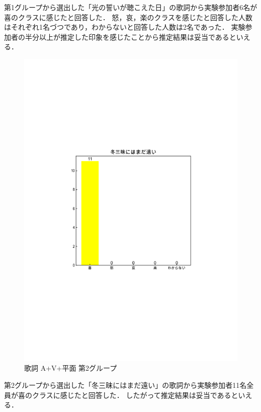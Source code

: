 第1グループから選出した「光の誓いが聴こえた日」の歌詞から実験参加者6名が喜のクラスに感じたと回答した．
怒，哀，楽のクラスを感じたと回答した人数はそれぞれ1名づつであり，わからないと回答した人数は2名であった．
実験参加者の半分以上が推定した印象を感じたことから推定結果は妥当であるといえる．
\newpage
\begin{figure}[H]
    \centering
    \includegraphics[width=14cm]{4314.pdf}
    \vspace{-1mm}
    \caption{歌詞 A+V+平面 第2グループ}
    \label{fig:mms}
    \vspace{5mm}
\end{figure}
第2グループから選出した「冬三昧にはまだ遠い」の歌詞から実験参加者11名全員が喜のクラスに感じたと回答した．
したがって推定結果は妥当であるといえる．
\newpage

